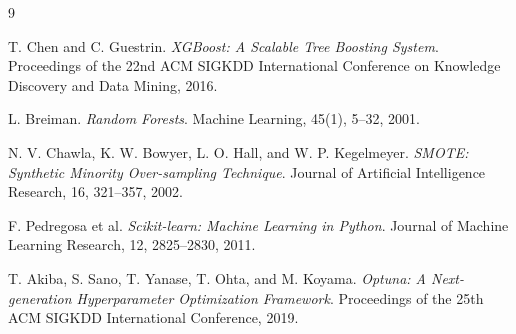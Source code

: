\documentclass[12pt,a4paper]{article}
\begin{document}
\begin{thebibliography}{9}

T. Chen and C. Guestrin.
\textit{XGBoost: A Scalable Tree Boosting System}.
Proceedings of the 22nd ACM SIGKDD International Conference on Knowledge Discovery and Data Mining, 2016.

L. Breiman.
\textit{Random Forests}.
Machine Learning, 45(1), 5--32, 2001.

N. V. Chawla, K. W. Bowyer, L. O. Hall, and W. P. Kegelmeyer.
\textit{SMOTE: Synthetic Minority Over-sampling Technique}.
Journal of Artificial Intelligence Research, 16, 321--357, 2002.

F. Pedregosa et al.
\textit{Scikit-learn: Machine Learning in Python}.
Journal of Machine Learning Research, 12, 2825--2830, 2011.

T. Akiba, S. Sano, T. Yanase, T. Ohta, and M. Koyama.
\textit{Optuna: A Next-generation Hyperparameter Optimization Framework}.
Proceedings of the 25th ACM SIGKDD International Conference, 2019.

\end{thebibliography}
\end{document}
